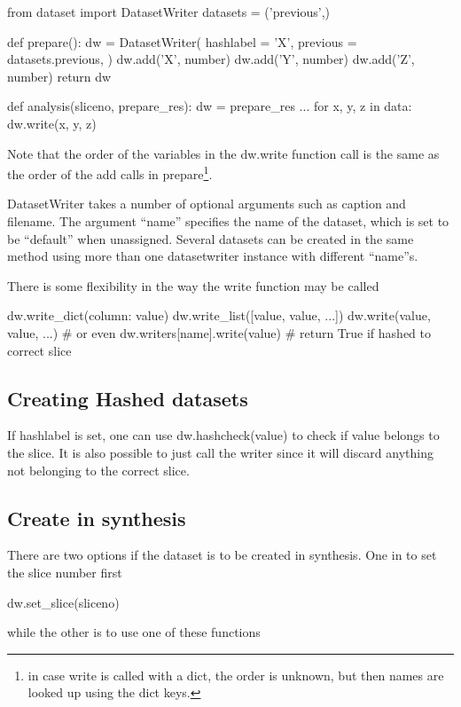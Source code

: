 \begin{python}
from dataset import DatasetWriter
datasets = ('previous',)

def prepare():
  dw = DatasetWriter(
    hashlabel = 'X',
    previous = datasets.previous,
  )
  dw.add('X', number)
  dw.add('Y', number)
  dw.add('Z', number)
  return dw

def analysis(sliceno, prepare_res):
  dw = prepare_res
  ...
  for x, y, z in data:
    dw.write(x, y, z)
\end{python}
Note that the order of the variables in the dw.write function call is
the same as the order of the add calls in prepare\footnote{in case
  write is called with a dict, the order is unknown, but then names
  are looked up using the dict keys.}.

DatasetWriter takes a number of optional arguments such as caption and
filename.  The argument ``name'' specifies the name of the dataset,
which is set to be ``default'' when unassigned.  Several datasets can
be created in the same method using more than one datasetwriter
instance with different ``name''s.

There is some flexibility in the way the write function may be called

\begin{python}
  dw.write_dict({column: value})
  dw.write_list([value, value, ...])
  dw.write(value, value, ...)
  # or even
  dw.writers[name].write(value)  # return True if hashed to correct slice
\end{python}



\subsection{Creating Hashed datasets}

If hashlabel is set, one can use dw.hashcheck(value) to check if value
belongs to the slice.  It is also possible to just call the writer
since it will discard anything not belonging to the correct slice.



\subsection{Create in synthesis}

There are two options if the dataset is to be created in synthesis.
One in to set the slice number first

\begin{python}
  dw.set_slice(sliceno)
\end{python}
while the other is to use one of these functions

